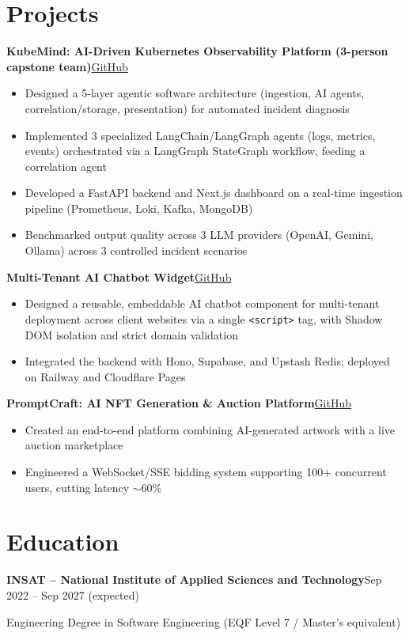 \documentclass[10pt,a4paper]{article}
\newcommand{\entry}[2]{\vspace{1pt}\noindent\textbf{#1}\hfill{\color{muted}#2}\par}
\newcommand{\gh}[1]{\href{https://github.com/Hsan003/#1}{GitHub}}
\begin{document}
\section{Projects}
\entry{KubeMind: AI-Driven Kubernetes Observability Platform (3-person capstone team)}{\gh{kubemind}}
\begin{itemize}
  \item Designed a 5-layer agentic software architecture (ingestion, AI agents, correlation/storage, presentation) for automated incident diagnosis
  \item Implemented 3 specialized LangChain/LangGraph agents (logs, metrics, events) orchestrated via a LangGraph StateGraph workflow, feeding a correlation agent
  \item Developed a FastAPI backend and Next.js dashboard on a real-time ingestion pipeline (Prometheus, Loki, Kafka, MongoDB)
  \item Benchmarked output quality across 3 LLM providers (OpenAI, Gemini, Ollama) across 3 controlled incident scenarios
\end{itemize}
\entry{Multi-Tenant AI Chatbot Widget}{\gh{AI-Assistant-Backend}}
\begin{itemize}
  \item Designed a reusable, embeddable AI chatbot component for multi-tenant deployment across client websites via a single \texttt{<script>} tag, with Shadow DOM isolation and strict domain validation
  \item Integrated the backend with Hono, Supabase, and Upstash Redis; deployed on Railway and Cloudflare Pages
\end{itemize}
\entry{PromptCraft: AI NFT Generation \& Auction Platform}{\gh{prompt-craft-back}}
\begin{itemize}
  \item Created an end-to-end platform combining AI-generated artwork with a live auction marketplace
  \item Engineered a WebSocket/SSE bidding system supporting 100+ concurrent users, cutting latency $\sim$60\%
\end{itemize}

\section{Education}
\entry{INSAT -- National Institute of Applied Sciences and Technology}{Sep 2022 -- Sep 2027 (expected)}
Engineering Degree in Software Engineering (EQF Level 7 / Master's equivalent)
\end{document}

